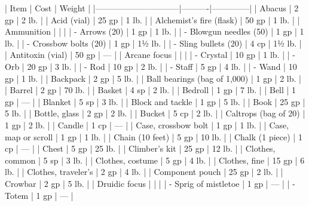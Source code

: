 | Item                         | Cost     | Weight       |
|------------------------------|----------|--------------|
| Abacus                       | 2 gp     | 2 lb.        |
| Acid (vial)                  | 25 gp    | 1 lb.        |
| Alchemist's fire (flask)     | 50 gp    | 1 lb.        |
| Ammunition            |          |              |
| - Arrows (20)              | 1 gp     | 1 lb.        |
| - Blowgun needles (50)     | 1 gp     | 1 lb.        |
| - Crossbow bolts (20)      | 1 gp     | 1½ lb.       |
| - Sling bullets (20)       | 4 cp     | 1½ lb.       |
| Antitoxin (vial)             | 50 gp    | —            |
| Arcane focus           |          |              |
| - Crystal                  | 10 gp    | 1 lb.        |
| - Orb                      | 20 gp    | 3 lb.        |
| - Rod                      | 10 gp    | 2 lb.        |
| - Staff                    | 5 gp     | 4 lb.        |
| - Wand                     | 10 gp    | 1 lb.        |
| Backpack                     | 2 gp     | 5 lb.        |
| Ball bearings (bag of 1,000) | 1 gp     | 2 lb.        |
| Barrel                       | 2 gp     | 70 lb.       |
| Basket                       | 4 sp     | 2 lb.        |
| Bedroll                      | 1 gp     | 7 lb.        |
| Bell                         | 1 gp     | —            |
| Blanket                      | 5 sp     | 3 lb.        |
| Block and tackle             | 1 gp     | 5 lb.        |
| Book                         | 25 gp    | 5 lb.        |
| Bottle, glass                | 2 gp     | 2 lb.        |
| Bucket                       | 5 cp     | 2 lb.        |
| Caltrops (bag of 20)         | 1 gp     | 2 lb.        |
| Candle                       | 1 cp     | —            |
| Case, crossbow bolt          | 1 gp     | 1 lb.        |
| Case, map or scroll          | 1 gp     | 1 lb.        |
| Chain (10 feet)              | 5 gp     | 10 lb.       |
| Chalk (1 piece)              | 1 cp     | —            |
| Chest                        | 5 gp     | 25 lb.       |
| Climber's kit                | 25 gp    | 12 lb.       |
| Clothes, common              | 5 sp     | 3 lb.        |
| Clothes, costume             | 5 gp     | 4 lb.        |
| Clothes, fine                | 15 gp    | 6 lb.        |
| Clothes, traveler's          | 2 gp     | 4 lb.        |
| Component pouch              | 25 gp    | 2 lb.        |
| Crowbar                      | 2 gp     | 5 lb.        |
| Druidic focus          |          |              |
| - Sprig of mistletoe         | 1 gp     | —            |
| - Totem                      | 1 gp     | —            |
